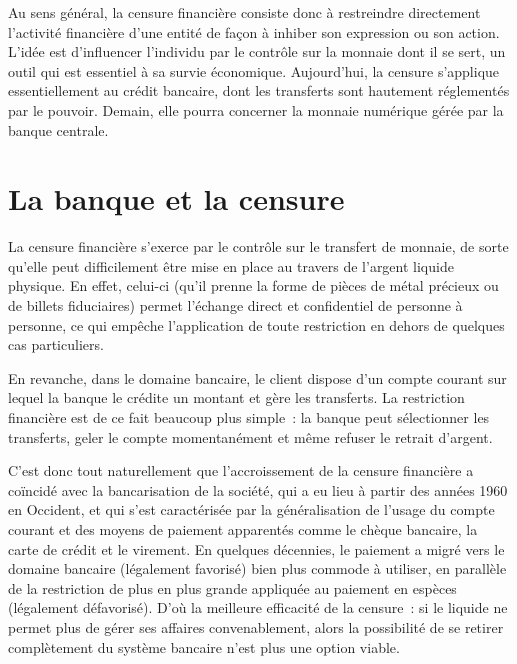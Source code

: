 Au sens général, la censure financière consiste donc à restreindre directement l'activité financière d'une entité de façon à inhiber son expression ou son action. L'idée est d'influencer l'individu par le contrôle sur la monnaie dont il se sert, un outil qui est essentiel à sa survie économique. Aujourd'hui, la censure s'applique essentiellement au crédit bancaire, dont les transferts sont hautement réglementés par le pouvoir. Demain, elle pourra concerner la monnaie numérique gérée par la banque centrale.

\section*{La banque et la censure}

La censure financière s'exerce par le contrôle sur le transfert de monnaie, de sorte qu'elle peut difficilement être mise en place au travers de l'argent liquide physique. En effet, celui-ci (qu'il prenne la forme de pièces de métal précieux ou de billets fiduciaires) permet l'échange direct et confidentiel de personne à personne, ce qui empêche l'application de toute restriction en dehors de quelques cas particuliers.

En revanche, dans le domaine bancaire, le client dispose d'un compte courant sur lequel la banque le crédite un montant et gère les transferts. La restriction financière est de ce fait beaucoup plus simple~: la banque peut sélectionner les transferts, geler le compte momentanément et même refuser le retrait d'argent.

C'est donc tout naturellement que l'accroissement de la censure financière a coïncidé avec la bancarisation de la société, qui a eu lieu à partir des années 1960 en Occident, et qui s'est caractérisée par la généralisation de l'usage du compte courant et des moyens de paiement apparentés comme le chèque bancaire, la carte de crédit et le virement. En quelques décennies, le paiement a migré vers le domaine bancaire (légalement favorisé) bien plus commode à utiliser, en parallèle de la restriction de plus en plus grande appliquée au paiement en espèces (légalement défavorisé). D'où la meilleure efficacité de la censure~: si le liquide ne permet plus de gérer ses affaires convenablement, alors la possibilité de se retirer complètement du système bancaire n'est plus une option viable.

